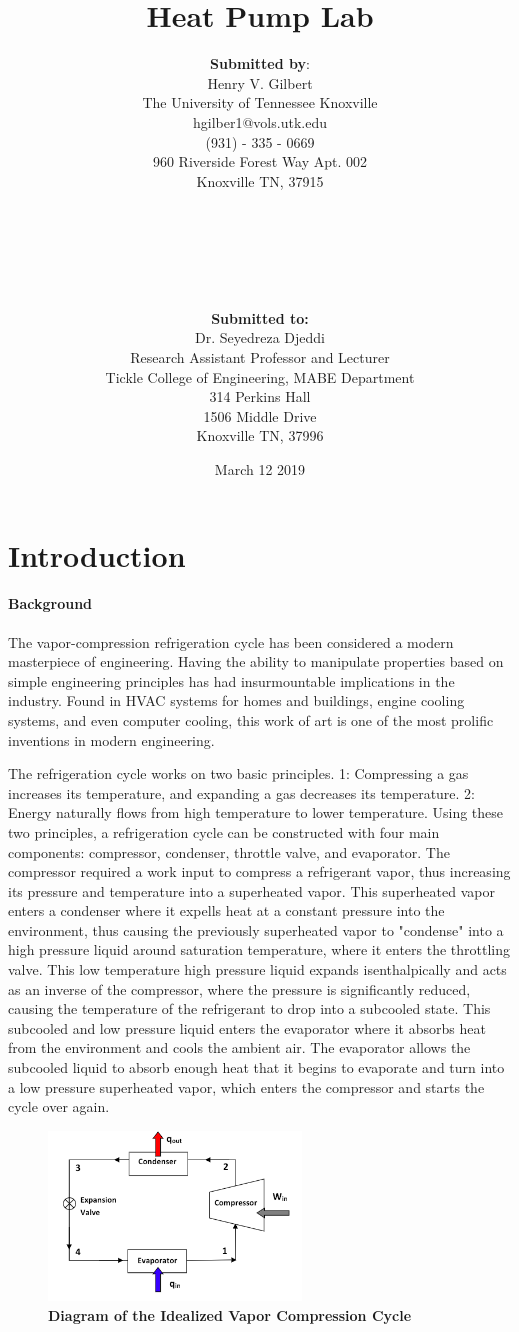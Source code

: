 \documentclass{article}
\title{Heat Pump Lab}
\author{
	\textbf{Submitted by}: \\
	Henry V. Gilbert \\
	The University of Tennessee Knoxville \\
	hgilber1@vols.utk.edu \\
	(931) - 335 - 0669 \\
	960 Riverside Forest Way
	Apt. 002 \\
	Knoxville TN, 37915\\ \\ \\ \\ \\ \\ \\ 
	\textbf{Submitted to: }\\ 
	Dr. Seyedreza Djeddi \\
	Research Assistant Professor and Lecturer \\
	Tickle College of Engineering, MABE Department \\
	314 Perkins Hall \\
	1506 Middle Drive \\
	Knoxville TN, 37996 \\
	}
\date {March 12 2019}
\begin{document}
\maketitle

\newpage
\section{Introduction}
\paragraph{Background} 
The vapor-compression refrigeration cycle has been considered a modern masterpiece of engineering. Having the ability
to manipulate properties based on simple engineering principles has had insurmountable implications in the industry. 
Found in HVAC systems for homes and buildings, engine cooling systems, and even computer cooling, this work of 
art is one of the most prolific inventions in modern engineering.

The refrigeration cycle works on two basic principles. 1: Compressing a gas increases its temperature, and expanding a gas decreases its temperature. 2: Energy naturally flows from high temperature to lower temperature. Using these two principles, a refrigeration cycle can be constructed with four main components: compressor, condenser, throttle valve, and evaporator. The compressor required a work input to compress a refrigerant vapor, thus increasing its pressure and temperature into a superheated vapor. This superheated vapor enters a condenser where it expells heat at a constant pressure into the environment, thus causing the previously superheated vapor to "condense" into a high pressure liquid around saturation temperature, where it enters the throttling valve. This low temperature high pressure liquid expands isenthalpically and acts as an inverse of the compressor, where the pressure is significantly reduced, causing the temperature of the refrigerant to drop into a subcooled state. This subcooled and low pressure liquid enters the evaporator where it absorbs heat from the environment and cools the ambient air. The evaporator allows the subcooled liquid to absorb enough heat that it begins to evaporate and turn into a low pressure superheated vapor, which enters the compressor and starts the cycle over again. 

\begin{figure} [H]
	\centering
	\includegraphics[width=0.6\textwidth]{Vapor_comp_cycle}
	\caption{\textbf{Diagram of the Idealized Vapor Compression Cycle}}
\end{figure}
\end{document}
